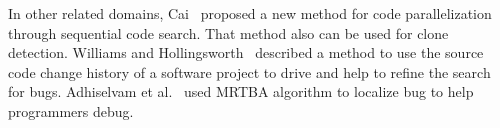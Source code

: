 In other related domains, Cai~\cite{cai2016code} proposed a new method
for code parallelization through sequential code search. That method also
can be used for clone detection. Williams and Hollingsworth~
described a method to use the source code change history of a
software project to drive and help to refine the search for bugs.
Adhiselvam et al.~\cite{adhiselvam2015enhanced} used MRTBA algorithm
to localize bug to help programmers debug.







